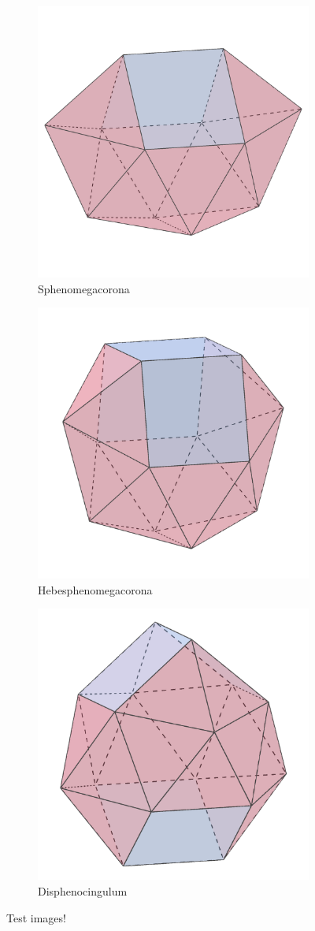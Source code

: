 \documentclass{article}
\begin{document}
\begin{figure}[h]
  \centering
  \begin{subfigure}{.33333\textwidth}
    \centering
    \includegraphics[width=.5\linewidth]{Sphenomegacorona}
    \caption{Sphenomegacorona}
    \label{fig:polyhedra_1}
  \end{subfigure}%
  \begin{subfigure}{.33333\textwidth}
    \centering
    \includegraphics[width=.5\linewidth]{Hebesphenomegacorona}
    \caption{Hebesphenomegacorona}
    \label{fig:polyhedra_2}
  \end{subfigure}%
  \begin{subfigure}{.33333\textwidth}
    \centering
    \includegraphics[width=.5\linewidth]{Disphenocingulum}
    \caption{Disphenocingulum}
    \label{fig:polyhedra_3}
  \end{subfigure}%
  \caption{Test images!}
  \label{fig:polyhedra}
\end{figure}
\end{document}

